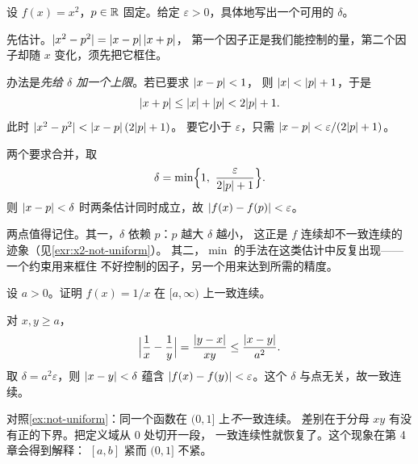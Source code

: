 \begin{example}
  \label{ex:choose-delta}
  设 \(f(x)=x^{2}\)，\(p \in \mathbb{R}\) 固定。给定 \(\varepsilon>0\)，具体地写出一个可用的 \(\delta\)。
  \begin{worked}
    先估计。\(\lvert x^{2}-p^{2}\rvert = \lvert x-p\rvert\,\lvert x+p\rvert\)，
    第一个因子正是我们能控制的量，第二个因子却随 \(x\) 变化，须先把它框住。

    办法是\emph{先给 \(\delta\) 加一个上限}。若已要求 \(\lvert x-p\rvert<1\)，
    则 \(\lvert x\rvert < \lvert p\rvert+1\)，于是
    \begin{equation}
      \label{eq:bound-sum}
      \lvert x+p\rvert \le \lvert x\rvert+\lvert p\rvert < 2\lvert p\rvert+1 .
    \end{equation}
    此时 \(\lvert x^{2}-p^{2}\rvert < \lvert x-p\rvert\,(2\lvert p\rvert+1)\)。
    要它小于 \(\varepsilon\)，只需 \(\lvert x-p\rvert < \varepsilon/(2\lvert p\rvert+1)\)。

    两个要求合并，取
    \begin{equation}
      \label{eq:delta-choice}
      \delta = \min\Bigl\{1,\ \frac{\varepsilon}{2\lvert p\rvert+1}\Bigr\} .
    \end{equation}
    则 \(\lvert x-p\rvert<\delta\) 时两条估计同时成立，故 \(\lvert f(x)-f(p)\rvert<\varepsilon\)。

    两点值得记住。其一，\(\delta\) 依赖 \(p\)：\(p\) 越大 \(\delta\) 越小，
    这正是 \(f\) 连续却不一致连续的迹象（见\cref{exr:x2-not-uniform}）。
    其二，\(\min\) 的手法在这类估计中反复出现——一个约束用来框住
    不好控制的因子，另一个用来达到所需的精度。
  \end{worked}
\end{example}

\begin{example}[在什么范围上一致连续]
  \label{ex:one-over-x-uniform}
  设 \(a>0\)。证明 \(f(x)=1/x\) 在 \([a,\infty)\) 上一致连续。
  \begin{worked}
    对 \(x,y \ge a\)，
    \begin{equation}
      \label{eq:one-over-x-lip}
      \Bigl\lvert\frac{1}{x}-\frac{1}{y}\Bigr\rvert
        = \frac{\lvert y-x\rvert}{xy} \le \frac{\lvert x-y\rvert}{a^{2}} .
    \end{equation}
    取 \(\delta = a^{2}\varepsilon\)，则 \(\lvert x-y\rvert<\delta\) 蕴含
    \(\lvert f(x)-f(y)\rvert<\varepsilon\)。这个 \(\delta\) 与点无关，故一致连续。

    对照\cref{ex:not-uniform}：同一个函数在 \((0,1]\) 上\emph{不}一致连续。
    差别在于分母 \(xy\) 有没有正的下界。把定义域从 \(0\) 处切开一段，
    一致连续性就恢复了。这个现象在第 4 章会得到解释：
    \([a,b]\) 紧而 \((0,1]\) 不紧。
  \end{worked}
\end{example}

